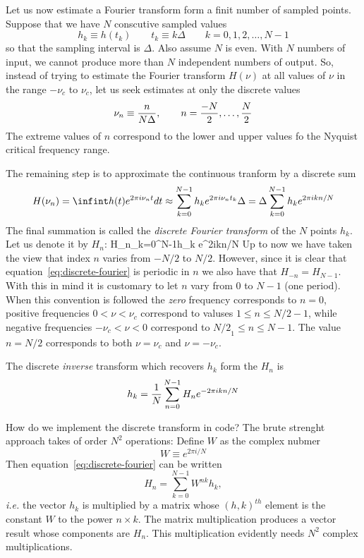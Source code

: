 Let us now estimate a Fourier transform form a finit number of sampled points.
Suppose that we have $N$ conscutive sampled values
\[
h_k\equiv h(t_k) \qquad t_k\equiv k\Delta \qquad k=0,1,2,\ldots,N-1 
\]
so that the sampling interval is $\Delta$. Also assume $N$ is even. With $N$ 
numbers of input, we cannot produce more than $N$ independent numbers of 
output. So, instead of trying to estimate the Fourier transform $H(\nu)$ at 
all values of $\nu$ in the range $-\nu_c$ to $\nu_c$, let us seek estimates 
at only the discrete values
\[
\nu_n\equiv{n\over N\Delta},\qquad n={-N\over 2},\ldots,{N\over 2} 
\]
The extreme values of $n$ correspond to the lower and upper values fo the 
Nyquist critical frequency range. 

The remaining step is to approximate the continuous tranform by a discrete 
sum
\[
H(\nu_n)=\infint h(t)e^{2\pi i \nu_nt}dt\approx \sum_{k=0}^{N-1}h_ke^{2\pi i\nu_nt_k}\Delta=\Delta\sum_{k=0}^{N-1}h_k e^{2\pi ikn/N}
\]
The final summation is called the {\it discrete Fourier transform} of the $N$ 
points $h_k$. Let us denote it by $H_n$:
\be
H_n\equiv\sum_{k=0}^{N-1}h_k e^{2\pi ikn/N}
\label{eq:discret-fourier}
\ee
Up to now we have taken the view that index $n$ varies from $-N/2$ to $N/2$. 
However, since it is clear that equation~\ref{eq:discrete-fourier} is 
periodic in $n$ we also have that $H_{-n}=H_{N-1}$. With this in mind it is 
customary to let $n$ vary from $0$ to $N-1$ (one period). When this convention
is followed the {\it zero} frequency corresponds to $n=0$, positive 
frequencies $0<\nu<\nu_c$ correspond to valuses $1\le n\le {N/2}-1$, while
negative frequencies $-\nu_c<\nu<0$ correspond to ${N/2}_1\le n \le N-1$. The
value $n={N/2}$ corresponds to both $\nu=\nu_c$ and $\nu=-\nu_c$.

The discrete {\it inverse} transform which recovers $h_k$ form the $H_n$ is
\[
h_k={1\over N}\sum_{n=0}^{N-1}H_n e^{-2\pi ikn/N}
\]

How do we implement the discrete transform in code? The brute strenght 
approach takes of order $N^2$ operations: Define $W$ as the complex nubmer
\[
W\equiv e^{2\pi i/N}
\]
Then equation~\ref{eq:discrete-fourier} can be written 
\[
H_n=\sum_{k=0}^{N-1}W^{nk}h_k,
\]
{\it i.e.} the vector $h_k$ is multiplied by a matrix whose $(h,k)^{th}$
element is the constant $W$ to the power $n\times k$. The matrix multiplication
produces a vector result whose components are $H_n$. This multiplication
evidently needs $N^2$ complex multiplications. 

